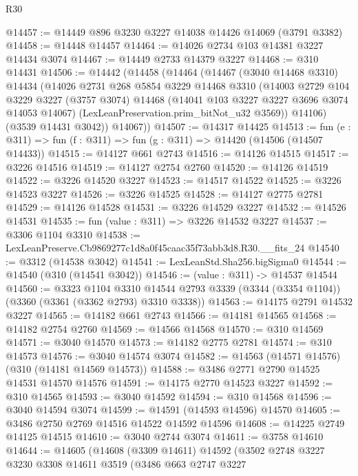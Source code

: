 \begin{lexlean}{R30}
\begin{coremodule}
@14457 := @14449 @896 @3230 @3227 @14038 @14426 @14069 (@3791 @3382)
@14458 := @14448 @14457
@14464 := @14026 @2734 @103 @14381 @3227 @14434 @3074
@14467 := @14449 @2733 @14379 @3227
@14468 := @310 @14431
@14506 := @14442
    (@14458
      (@14464
        (@14467
          (@3040 @14468 @3310)
          @14434
          (@14026
            @2731
            @268
            @5854
            @3229
            @14468
            @3310
            (@14003
              @2729
              @104
              @3229
              @3227
              (@3757 @3074)
              @14468
              (@14041 @103 @3227 @3227 @3696 @3074 @14053 @14067)
              (LexLeanPreservation.prim_bitNot_u32 @3569))
            @14106)
          (@3539 @14431 @3042))
        @14067))
@14507 := @14317 @14425
@14513 := fun (e : @311) => fun (f : @311) => fun (g : @311) => @14420 (@14506 (@14507 @14433))
@14515 := @14127 @661 @2743
@14516 := @14126 @14515
@14517 := @3226 @14516
@14519 := @14127 @2754 @2760
@14520 := @14126 @14519
@14522 := @3226 @14520 @3227
@14523 := @14517 @14522
@14525 := @3226 @14523 @3227
@14526 := @3226 @14525
@14528 := @14127 @2775 @2781
@14529 := @14126 @14528
@14531 := @3226 @14529 @3227
@14532 := @14526 @14531
@14535 := fun (value : @311) => @3226 @14532 @3227
@14537 := @3306 @1104 @3310
@14538 := LexLeanPreserve.Cb9869277c1d8a0f45caac35f73abb3d8.R30.__fits_24
@14540 := @3312 (@14538 @3042)
@14541 := LexLeanStd.Sha256.bigSigma0
@14544 := @14540 (@310 (@14541 @3042))
@14546 := (value : @311) -> @14537 @14544
@14560 := @3323
    @1104
    @3310
    @14544
    @2793
    @3339
    (@3344 (@3354 @1104))
    (@3360 (@3361 (@3362 @2793) @3310 @3338))
@14563 := @14175 @2791 @14532 @3227
@14565 := @14182 @661 @2743
@14566 := @14181 @14565
@14568 := @14182 @2754 @2760
@14569 := @14566 @14568
@14570 := @310 @14569
@14571 := @3040 @14570
@14573 := @14182 @2775 @2781
@14574 := @310 @14573
@14576 := @3040 @14574 @3074
@14582 := @14563 (@14571 @14576) (@310 (@14181 @14569 @14573))
@14588 := @3486 @2771 @2790 @14525 @14531 @14570 @14576
@14591 := @14175 @2770 @14523 @3227
@14592 := @310 @14565
@14593 := @3040 @14592
@14594 := @310 @14568
@14596 := @3040 @14594 @3074
@14599 := @14591 (@14593 @14596) @14570
@14605 := @3486 @2750 @2769 @14516 @14522 @14592 @14596
@14608 := @14225 @2749 @14125 @14515
@14610 := @3040 @2744 @3074
@14611 := @3758 @14610
@14644 := @14605
    (@14608
      (@3309 @14611)
      @14592
      (@3502
        @2748
        @3227
        @3230
        @3308
        @14611
        @3519
        (@3486
          @663
          @2747
          @3227

\end{coremodule}
\end{lexlean}
